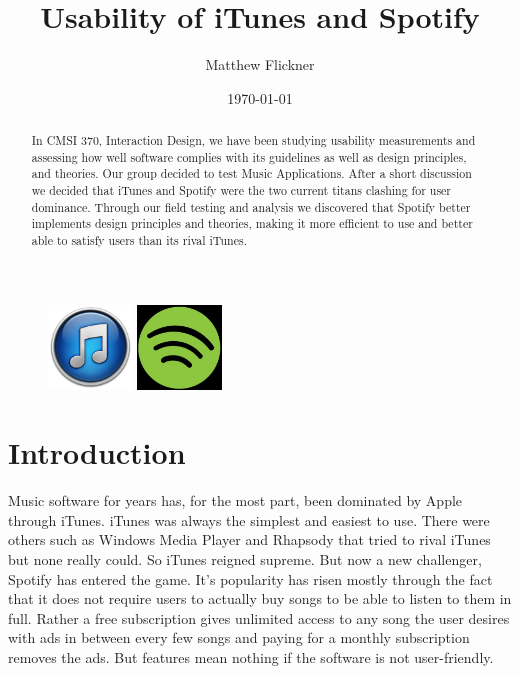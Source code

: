 \documentclass[a4paper]{article}
\title{Usability of iTunes and Spotify}
\author{Matthew Flickner}
\date{\today}
\begin{document}
\maketitle

\begin{abstract}
In CMSI 370, Interaction Design, we have been studying usability measurements and assessing how well software complies with its guidelines as well as design principles, and theories. Our group decided to test Music Applications. After a short discussion we decided that iTunes and Spotify were the two current titans clashing for user dominance. Through our field testing and analysis we discovered that Spotify better implements design principles and theories, making it more efficient to use and better able to satisfy users than its rival iTunes.
\end{abstract}

\begin{figure}[H]
\centering
\includegraphics[width=0.2\textwidth]{ITunes_11_Logo.png}
\includegraphics[width=0.2\textwidth]{spotifylogo.jpg}
\end{figure}

\section{Introduction}

Music software for years has, for the most part, been dominated by Apple through iTunes. iTunes was always the simplest and easiest to use. There were others such as Windows Media Player and Rhapsody that tried to rival iTunes but none really could. So iTunes reigned supreme. But now a new challenger, Spotify has entered the game. It's popularity has risen mostly through the fact that it does not require users to actually buy songs to be able to listen to them in full. Rather a free subscription gives unlimited access to any song the user desires with ads in between every few songs and paying for a monthly subscription removes the ads. But features mean nothing if the software is not user-friendly.
\end{document}
